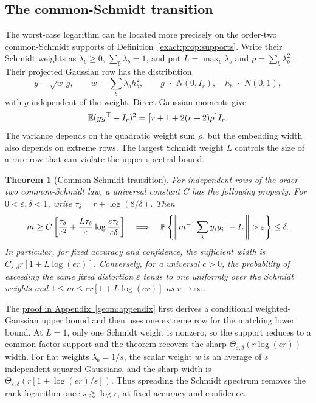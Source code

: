\documentclass[11pt,a4paper]{article}
\newtheorem{theorem}{Theorem}[section]
\theoremstyle{definition}\newtheorem{definition}[theorem]{Definition}
\theoremstyle{remark}\newtheorem{remark}[theorem]{Remark}
\numberwithin{equation}{section}
\newcommand{\Id}{I}\newcommand{\F}{\mathrm F}
\begin{document}
\subsection{The common-Schmidt transition}
The worst-case logarithm can be located more precisely on the order-two
common-Schmidt supports of Definition~\ref{exact:prop:supports}.
Write their Schmidt weights as $\lambda_b\ge0$, $\sum_b\lambda_b=1$, and
put $L=\max_b\lambda_b$ and $\rho=\sum_b\lambda_b^2$. Their projected
Gaussian row has the distribution
\[
 y=\sqrt w\,g,\qquad
 w=\sum_b\lambda_bh_b^2,\qquad
 g\sim N(0,\Id_r),\quad h_b\sim N(0,1),
\]
with $g$ independent of the weight. Direct Gaussian moments give
\begin{equation}\label{geom:eq:variance}
 \E(yy^\top-\Id_r)^2
 =\bigl[r+1+2(r+2)\rho\bigr]\Id_r.
\end{equation}
The variance depends on the quadratic weight sum $\rho$, but the
embedding width also depends on extreme rows. The largest Schmidt
weight $L$ controls the size of a rare row that can violate the upper
spectral bound.
\begin{theorem}[Common-Schmidt transition]\label{geom:thm:schmidt}
For independent rows of the order-two common-Schmidt law, a universal
constant $C$ has the following property. For $0<\varepsilon,\delta<1$,
write $\tau_\delta=r+\log(8/\delta)$. Then
\begin{equation}\label{geom:eq:all-confidence}
 m\ge C\left[\frac{\tau_\delta}{\varepsilon^2}
       +\frac{L\tau_\delta}{\varepsilon}
          \log\frac{e\tau_\delta}{\varepsilon\delta}\right]
 \quad\Longrightarrow\quad
 \mathbb P\left\{\left\|m^{-1}\sum_i y_iy_i^\top-I_r\right\|
          >\varepsilon\right\}\le\delta.
\end{equation}
In particular, for fixed accuracy and confidence, the sufficient width
is $C_{\varepsilon,\delta}r[1+L\log(er)]$.
Conversely, for a universal $c>0$, the probability of exceeding the same
fixed distortion $\varepsilon$ tends to one
uniformly over the Schmidt weights and
$1\le m\le cr[1+L\log(er)]$ as $r\to\infty$.
\end{theorem}
The \hyperref[proof:schmidt]{proof in Appendix~\ref*{geom:appendix}}
first derives a conditional weighted-Gaussian upper bound and then
uses one extreme row for the matching lower bound.
At $L=1$, only one Schmidt weight is nonzero, so the support reduces to
a common-factor support and the theorem recovers the sharp
$\Theta_{\varepsilon,\delta}(r\log(er))$ width. For flat weights
$\lambda_b=1/s$, the scalar weight $w$ is an average of $s$ independent
squared Gaussians, and the sharp width is
$\Theta_{\varepsilon,\delta}(r[1+\log(er)/s])$. Thus spreading the
Schmidt spectrum removes the rank logarithm once $s\gtrsim\log r$,
at fixed accuracy and confidence.
\end{document}
